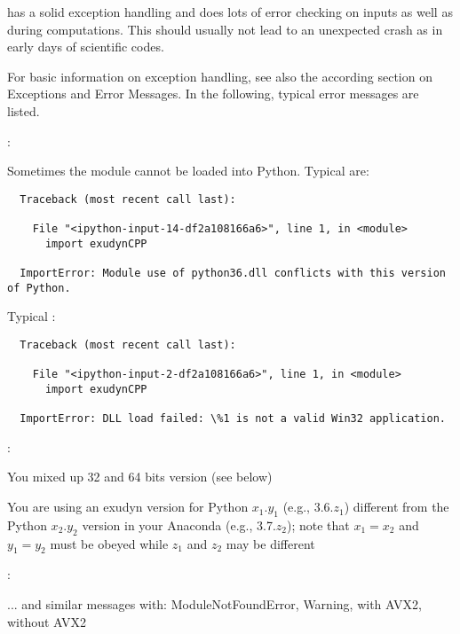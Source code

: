 \codeName has a solid exception handling and does lots of error checking on
inputs as well as during computations. This should usually not lead to an
unexpected crash as in early days of scientific codes.

For basic information on exception handling, see also the according section on
Exceptions and Error Messages. In the following, typical error messages are listed. 

\noindent {}:
\bi
  \item Sometimes the \codeName module cannot be loaded into Python. Typical  are: \vspace{1pt}\\
\plainlststyle
\begin{lstlisting}
  Traceback (most recent call last):

    File "<ipython-input-14-df2a108166a6>", line 1, in <module>
      import exudynCPP

  ImportError: Module use of python36.dll conflicts with this version of Python.
\end{lstlisting}
%
Typical :\vspace{1pt}\\
\begin{lstlisting}
  Traceback (most recent call last):
  
    File "<ipython-input-2-df2a108166a6>", line 1, in <module>
      import exudynCPP

  ImportError: DLL load failed: \%1 is not a valid Win32 application.
\end{lstlisting}
%
:
\bi
\item[$\ra$] You mixed up 32 and 64 bits version (see below) 
\item[$\ra$] You are using an exudyn version for Python $x_1.y_1$ (e.g., 3.6.$z_1$) different from the Python $x_2.y_2$ version in your Anaconda (e.g., 3.7.$z_2$); note that $x_1=x_2$ and $y_1=y_2$ must be obeyed while $z_1$ and $z_2$ may be different
\ei
%
\item {}:
\bi
\item[$\ra$] ... and similar messages with: ModuleNotFoundError, Warning, with AVX2, without AVX2
